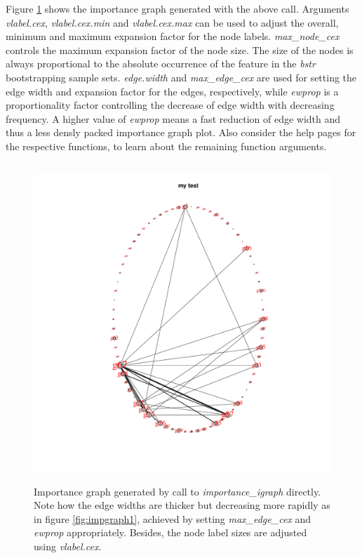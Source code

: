 \documentclass[11pt,a4paper]{article}
\begin{document}
Figure \ref{fig:impgraph2} shows the importance graph generated with the above call. Arguments \emph{vlabel.cex}, \emph{vlabel.cex.min} and \emph{vlabel.cex.max} can be used to adjust the overall, minimum and maximum expansion factor for the node labels. \emph{max\_node\_cex} controls the maximum expansion factor of the node size. The size of the nodes is always proportional to the absolute occurrence of the feature in the \emph{bstr} bootstrapping sample sets. \emph{edge.width} and \emph{max\_edge\_cex} are used for setting the edge width and expansion factor for the edges, respectively, while \emph{ewprop} is a proportionality factor controlling the decrease of edge width with decreasing frequency. A higher value of \emph{ewprop} means a fast reduction of edge width and thus a less densly packed importance graph plot. Also consider the help pages for the respective functions, to learn about the remaining function arguments.

\begin{figure}[htp]
\centering
\includegraphics[width=12cm,height=12cm]{impgraph2}
\caption{Importance graph generated by call to \emph{importance\_igraph} directly. Note how the edge widths are thicker but decreasing more rapidly as in figure \ref{fig:impgraph1}, achieved by setting \emph{max\_edge\_cex} and \emph{ewprop} appropriately. Besides, the node label sizes are adjusted using \emph{vlabel.cex}.}
\label{fig:impgraph2}
\end{figure}
\end{document}

